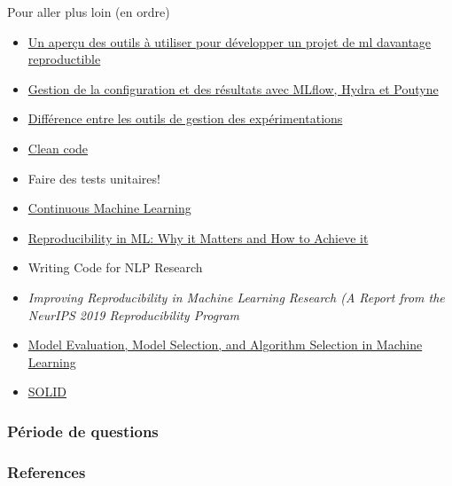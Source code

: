\documentclass[aspectratio=169,10pt,xcolor=x11names,english,french]{beamer}
\begin{document}
	\begin{frame}{Pour aller plus loin (en ordre)}
		\begin{itemize}
			\item \href{https://www.dotlayer.org/outils-reproductibilite-ml/}{Un aperçu des outils à utiliser pour développer un projet de ml davantage reproductible}
			\item \href{https://davebulaval.github.io/gestion-configuration-resultats/}{Gestion de la configuration et des résultats avec MLflow, Hydra et Poutyne}
			\item \href{https://www.reddit.com/r/MachineLearning/comments/mhchee/d_comparison_of_experiment_tracking_tools/?utm_medium=android_app&utm_source=share}{Différence entre les outils de gestion des expérimentations}
			\item \href{https://www.oreilly.com/library/view/clean-code-a/9780136083238/}{Clean code}
			\item Faire des tests unitaires!
			\item \href{https://github.com/iterative/cml}{Continuous Machine Learning}
			\item \href{https://determined.ai/blog/reproducibility-in-ml/}{Reproducibility in ML: Why it Matters and How to Achieve it}
			\item Writing Code for NLP Research \cite{gardner-etal-2018-writing}
			\item \textit{Improving Reproducibility in Machine Learning Research (A Report from the NeurIPS 2019 Reproducibility Program} \cite{pineau2020improving}
			\item \href{https://sebastianraschka.com/blog/2018/model-evaluation-selection-part4.html}{Model Evaluation, Model Selection, and Algorithm Selection in Machine Learning}
			\item \href{https://www.youtube.com/watch?v=t86v3N4OshQ&list=LLFp5G_2HoipBrGaw9iAcPPw&index=693}{SOLID}
		\end{itemize}
		\note{}
	\end{frame}
	
	\begin{frame}
		\frametitle{Période de questions}
		
		\centering
		\fontsize{100}{100}
		\faQuestion
			\note{}
	\end{frame}

	
	
	\begin{frame}[t, allowframebreaks]
		\frametitle{References}
		
		
			\note{}
	\end{frame}
	
	
	
\end{document}
